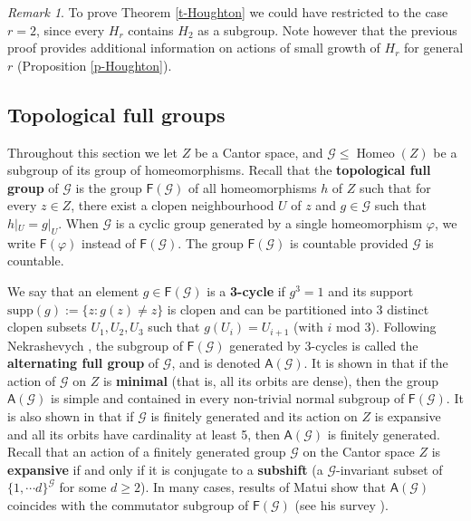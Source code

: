 \documentclass[11pt]{amsart}
\newcommand{\Gcal}{\ensuremath{\mathcal{G}}}%
\newcommand{\supp}{\ensuremath{\textrm{supp}}}%
\newcommand{\homeo}{\ensuremath{\operatorname{Homeo}}}%
\newcommand{\Fsf}{\ensuremath{\mathsf{F}}}
\newcommand{\Asf}{\ensuremath{\mathsf{A}}}
\theoremstyle{definition}
\theoremstyle{plain}
\theoremstyle{remark}
\newtheorem{remark}[defin]{Remark}
\begin{document}
 \begin{remark}
To prove Theorem \ref{t-Houghton} we could have restricted to the case $r=2$, since every $H_r$ contains $H_2$ as a subgroup. Note however that the previous proof provides additional information on actions of small growth of $H_r$ for general $r$ (Proposition \ref{p-Houghton}). 
\end{remark}



\subsection{Topological full groups} \label{subsec-full-group}

Throughout this section we let $Z$ be a Cantor space, and $\mathcal{G}\le \homeo(Z)$ be a subgroup of its group of homeomorphisms. Recall that the \textbf{topological full group} of $\mathcal{G}$ is the group $\Fsf(\mathcal{G})$ of all homeomorphisms $h$ of $Z$ such that for every $z\in Z$, there exist a clopen neighbourhood  $U$ of $z$ and $g\in \mathcal{G}$ such that $h|_U=g|_U$. When  $\mathcal{G}$ is a cyclic group generated by a single homeomorphism $\varphi$, we write $\Fsf(\varphi)$ instead of $\Fsf(\mathcal{G})$. The group $\Fsf(\mathcal{G})$ is countable provided $\Gcal$ is countable.

We say that an element $g\in \Fsf(\Gcal)$ is a \textbf{3-cycle} if $g^{3}=1$ 
and its support $\supp(g):=\{z\colon g(z)\neq z\}$ is clopen and can be partitioned into 3 distinct clopen subsets $U_1, U_2, U_3$ such that $g(U_i)=U_{i+1}$ (with $i$ mod 3). Following Nekrashevych \cite{Nek-simple}, the subgroup of $\Fsf(\Gcal)$ generated by 3-cycles is called the \textbf{alternating full group} of $\Gcal$, and is denoted $\Asf(\Gcal)$. It is shown in \cite{Nek-simple}  that if the action of $\Gcal$ on $Z$ is \textbf{minimal} (that is, all its orbits are dense), then the group $\Asf(\Gcal)$ is simple and contained in every non-trivial normal subgroup of $\Fsf(\Gcal)$. It is also shown in \cite{Nek-simple} that if $\Gcal$ is finitely generated and its action on $Z$ is expansive and all its  orbits have cardinality at least 5, then $\Asf(\Gcal)$ is finitely generated. Recall that an action of a finitely generated group $\Gcal$ on the Cantor space $Z$ is \textbf{expansive} if and only if it is conjugate to a \textbf{subshift} (a $\Gcal$-invariant subset of $\{1, \cdots d\}^\Gcal$ for some $d\ge 2$).
In many cases, results of Matui show that $\Asf(\Gcal)$ coincides with the commutator subgroup of $\Fsf(\Gcal)$ (see his survey \cite{Mat-survey}).  
\end{document}
